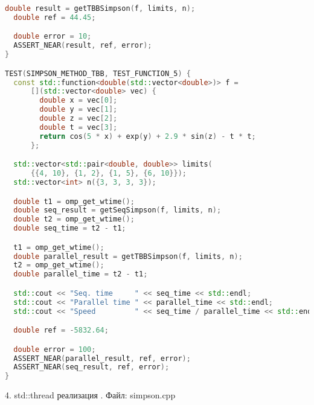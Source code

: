 \documentclass{report}
\begin{document}
\begin{lstlisting}[language=C++]
  double result = getTBBSimpson(f, limits, n);
  double ref = 44.45;

  double error = 10;
  ASSERT_NEAR(result, ref, error);
}

TEST(SIMPSON_METHOD_TBB, TEST_FUNCTION_5) {
  const std::function<double(std::vector<double>)> f =
      [](std::vector<double> vec) {
        double x = vec[0];
        double y = vec[1];
        double z = vec[2];
        double t = vec[3];
        return cos(5 * x) + exp(y) + 2.9 * sin(z) - t * t;
      };

  std::vector<std::pair<double, double>> limits(
      {{4, 10}, {1, 2}, {1, 5}, {6, 10}});
  std::vector<int> n({3, 3, 3, 3});

  double t1 = omp_get_wtime();
  double seq_result = getSeqSimpson(f, limits, n);
  double t2 = omp_get_wtime();
  double seq_time = t2 - t1;

  t1 = omp_get_wtime();
  double parallel_result = getTBBSimpson(f, limits, n);
  t2 = omp_get_wtime();
  double parallel_time = t2 - t1;

  std::cout << "Seq. time     " << seq_time << std::endl;
  std::cout << "Parallel time " << parallel_time << std::endl;
  std::cout << "Speed         " << seq_time / parallel_time << std::endl;

  double ref = -5832.64;

  double error = 100;
  ASSERT_NEAR(parallel_result, ref, error);
  ASSERT_NEAR(seq_result, ref, error);
}
\end{lstlisting}
\par 4. std::thread реализация . Файл: simpson.cpp
\end{document}
